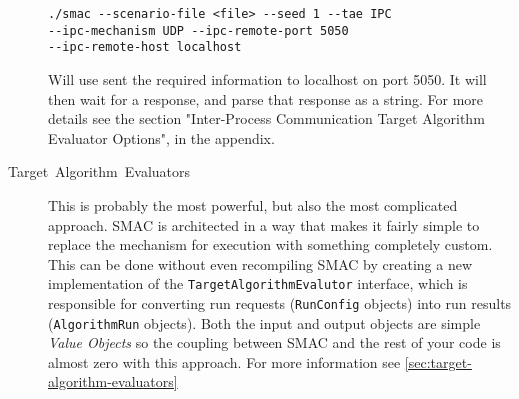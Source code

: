 \documentclass[manual.tex]{subfiles}
\begin{document}
\begin{description}
\begin{verbatim}
./smac --scenario-file <file> --seed 1 --tae IPC 
--ipc-mechanism UDP --ipc-remote-port 5050 
--ipc-remote-host localhost
\end{verbatim}

Will use sent the required information to localhost on port 5050. It will then wait for a response, and parse that response as a string. For more details see the section "Inter-Process Communication Target Algorithm Evaluator Options", in the appendix.


\item [{Target~Algorithm~Evaluators}]	This is probably the most powerful, but also the most complicated approach. SMAC is architected in a way that makes it fairly simple to replace the mechanism for execution with something completely custom. This can be done without even recompiling SMAC by creating a new implementation of the \texttt{TargetAlgorithmEvalutor} interface, which is responsible for converting run requests (\texttt{RunConfig} objects) into run results (\texttt{AlgorithmRun} objects). Both the input and output objects are simple \emph{Value Objects} so the coupling between SMAC and the rest of your code is almost zero with this approach.  For more information see \ref{sec:target-algorithm-evaluators}


\end{description}
\end{document}
